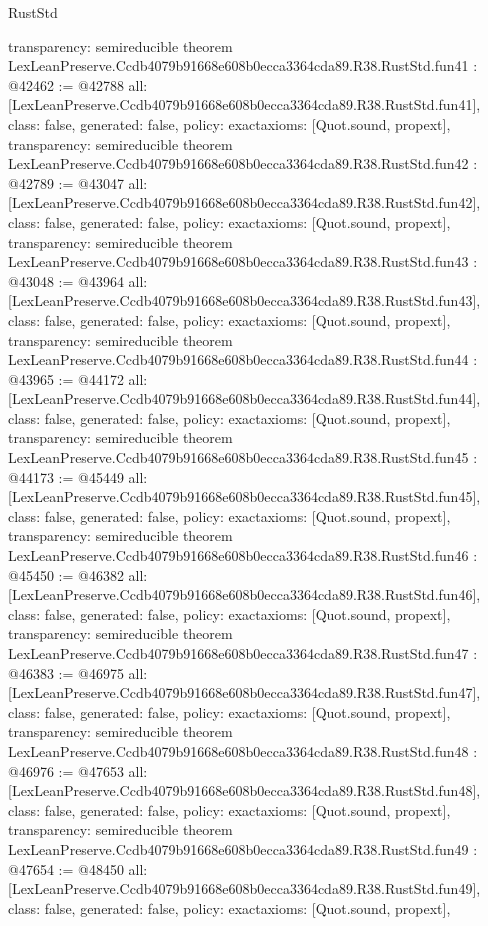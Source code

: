 \begin{lexlean}{RustStd}
\begin{coremodule}
{  transparency: semireducible
}
theorem LexLeanPreserve.Ccdb4079b91668e608b0ecca3364cda89.R38.RustStd.fun41 : @42462 := @42788 {
  all: [LexLeanPreserve.Ccdb4079b91668e608b0ecca3364cda89.R38.RustStd.fun41],
  class: false,
  generated: false,
  policy: exact{axioms: [Quot.sound, propext]},
  transparency: semireducible
}
theorem LexLeanPreserve.Ccdb4079b91668e608b0ecca3364cda89.R38.RustStd.fun42 : @42789 := @43047 {
  all: [LexLeanPreserve.Ccdb4079b91668e608b0ecca3364cda89.R38.RustStd.fun42],
  class: false,
  generated: false,
  policy: exact{axioms: [Quot.sound, propext]},
  transparency: semireducible
}
theorem LexLeanPreserve.Ccdb4079b91668e608b0ecca3364cda89.R38.RustStd.fun43 : @43048 := @43964 {
  all: [LexLeanPreserve.Ccdb4079b91668e608b0ecca3364cda89.R38.RustStd.fun43],
  class: false,
  generated: false,
  policy: exact{axioms: [Quot.sound, propext]},
  transparency: semireducible
}
theorem LexLeanPreserve.Ccdb4079b91668e608b0ecca3364cda89.R38.RustStd.fun44 : @43965 := @44172 {
  all: [LexLeanPreserve.Ccdb4079b91668e608b0ecca3364cda89.R38.RustStd.fun44],
  class: false,
  generated: false,
  policy: exact{axioms: [Quot.sound, propext]},
  transparency: semireducible
}
theorem LexLeanPreserve.Ccdb4079b91668e608b0ecca3364cda89.R38.RustStd.fun45 : @44173 := @45449 {
  all: [LexLeanPreserve.Ccdb4079b91668e608b0ecca3364cda89.R38.RustStd.fun45],
  class: false,
  generated: false,
  policy: exact{axioms: [Quot.sound, propext]},
  transparency: semireducible
}
theorem LexLeanPreserve.Ccdb4079b91668e608b0ecca3364cda89.R38.RustStd.fun46 : @45450 := @46382 {
  all: [LexLeanPreserve.Ccdb4079b91668e608b0ecca3364cda89.R38.RustStd.fun46],
  class: false,
  generated: false,
  policy: exact{axioms: [Quot.sound, propext]},
  transparency: semireducible
}
theorem LexLeanPreserve.Ccdb4079b91668e608b0ecca3364cda89.R38.RustStd.fun47 : @46383 := @46975 {
  all: [LexLeanPreserve.Ccdb4079b91668e608b0ecca3364cda89.R38.RustStd.fun47],
  class: false,
  generated: false,
  policy: exact{axioms: [Quot.sound, propext]},
  transparency: semireducible
}
theorem LexLeanPreserve.Ccdb4079b91668e608b0ecca3364cda89.R38.RustStd.fun48 : @46976 := @47653 {
  all: [LexLeanPreserve.Ccdb4079b91668e608b0ecca3364cda89.R38.RustStd.fun48],
  class: false,
  generated: false,
  policy: exact{axioms: [Quot.sound, propext]},
  transparency: semireducible
}
theorem LexLeanPreserve.Ccdb4079b91668e608b0ecca3364cda89.R38.RustStd.fun49 : @47654 := @48450 {
  all: [LexLeanPreserve.Ccdb4079b91668e608b0ecca3364cda89.R38.RustStd.fun49],
  class: false,
  generated: false,
  policy: exact{axioms: [Quot.sound, propext]},
}
\end{coremodule}
\end{lexlean}
